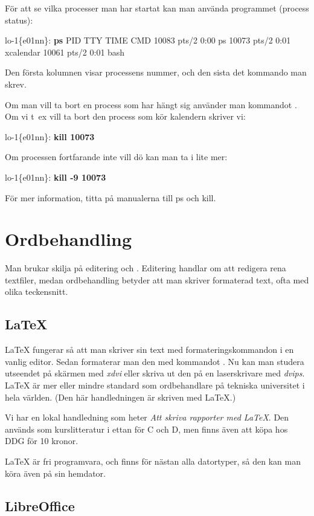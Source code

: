 \documentclass[a4paper,twocolumn]{book}
\begin{document}
För att se vilka processer man har startat kan man använda programmet
 (process status):
\begin{example}
lo-1\{e01nn\}: \textbf{ps}
   PID TTY      TIME CMD
 10083 pts/2    0:00 ps
 10073 pts/2    0:01 xcalendar
 10061 pts/2    0:01 bash
\end{example}
Den första kolumnen visar processens nummer, och den sista det
kommando man skrev.

Om man vill ta bort en process som har hängt sig använder man
kommandot . Om vi t~ex vill ta bort den process som kör
kalendern skriver vi:
\begin{example}
lo-1\{e01nn\}: \textbf{kill 10073}
\end{example}
Om processen fortfarande inte vill dö kan man ta i lite mer:
\begin{example}
lo-1\{e01nn\}: \textbf{kill -9 10073}
\end{example}
För mer information, titta på manualerna till ps och kill.

\section{Ordbehandling}

Man brukar skilja på editering och . Editering
handlar om att redigera rena textfiler, medan ordbehandling betyder
att man skriver formaterad text, ofta med olika teckensnitt.

\subsection{\LaTeX}

\LaTeX{} fungerar så
att man skriver sin text med formateringskommandon i en vanlig
editor. Sedan formaterar man den med kommandot . Nu
kan man studera utseendet på skärmen med \emph{xdvi} eller skriva ut
den på en laserskrivare med \emph{dvips}. \LaTeX{} är mer eller mindre
standard som ordbehandlare på tekniska universitet i hela världen.  (Den
här handledningen är skriven med \LaTeX.)

Vi har en lokal handledning som heter \emph{Att skriva rapporter med
\LaTeX}. Den används som kurslitteratur i ettan för C och D, men finns även 
att köpa hos DDG för 10 kronor.

\LaTeX{} är fri programvara, och finns för nästan alla datortyper, så
den kan man köra även på sin hemdator.

\subsection{LibreOffice}
\end{document}
